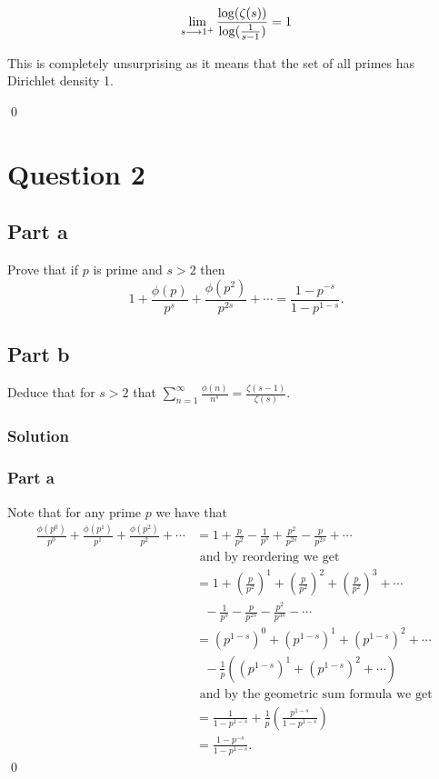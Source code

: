 \documentclass{unswmaths}
\begin{document}
$$
	\lim_{s \longrightarrow 1^+} \frac{\log(\zeta(s))}{\log(\frac{1}{s-1})} = 1
$$

This is completely unsurprising as it means that the set of all primes has Dirichlet density 1.

\qed

\section*{Question 2}

\subsection*{Part a}

Prove that if $ p $ is prime and $ s > 2 $ then
$$
	1 + \frac{\phi(p)}{p^s} + \frac{\phi(p^2)}{p^{2s}} + \cdots = \frac{1-p^{-s}}{1-p^{1-s}}.
$$

\subsection*{Part b}

Deduce that for $ s > 2 $ that $ \sum_{n=1}^\infty \frac{\phi(n)}{n^s} = \frac{\zeta(s-1)}{\zeta(s)} $.

\subsubsection*{Solution}

\subsubsection*{Part a}
Note that for any prime $ p $ we have that
\begin{align*}
	\frac{\phi(p^0)}{p^0} + \frac{\phi(p^1)}{p^1} + \frac{\phi(p^2)}{p^2} + \cdots 
		&= 1 + \frac{p}{p^2} - \frac{1}{p^s} + \frac{p^2}{p^{2s}} - \frac{p}{p^{2s}} + \cdots \\
		& \text{ and by reordering we get } \\
		&= 1 + \left( \frac{p}{p^2} \right)^1+ \left( \frac{p}{p^2} \right)^2 + \left( \frac{p}{p^2} \right)^3 + \cdots \\
		& \ \ \ - \frac{1}{p^s} - \frac{p}{p^{2s}} - \frac{p^2}{p^{3s}} - \cdots \\
		&= (p^{1-s})^0 + (p^{1-s})^1 + (p^{1-s})^2 + \cdots \\
		& \ \ \ - \frac{1}{p} \left( (p^{1-s})^1 + (p^{1-s})^2 + \cdots \right) \\
		& \text{ and by the geometric sum formula we get } \\
		&= \frac{1}{1-p^{1-s}} + \frac{1}{p} \left( \frac{p^{1-s}}{1-p^{1-s}} \right) \\
		&= \frac{1-p^{-s}}{1-p^{1-s}}.
\end{align*}
\qed
\end{document}
